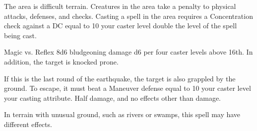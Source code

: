 \begin{spellheader}
\end{spellheader}
\begin{spellcontent}
    \begin{spelltargetinginfo}
    \end{spelltargetinginfo}
    \begin{spelleffects}
        \spelleffect The area is difficult terrain. Creatures in the area take a  penalty to physical attacks, defenses, and checks. Casting a spell in the area requires a Concentration check against a DC equal to 10 \add your caster level \add double the level of the spell being cast.
    \end{spelleffects}
\end{spellcontent}
\begin{spellsubcontent}
    \begin{spelltargetinginfo}
    \end{spelltargetinginfo}
    \begin{spelleffects}
        \begin{spellattack}{Magic vs. Reflex}
            \spellsuccess 8d6 bludgeoning damage \add d6 per four caster levels above 16th. In addition, the target is knocked prone.

            If this is the last round of the earthquake, the target is also grappled by the ground. To escape, it must beat a Maneuver defense equal to 10 \add your caster level \add your casting attribute.
            \spellfailure Half damage, and no effects other than damage.
        \end{spellattack}
    \end{spelleffects}
\end{spellsubcontent}
\begin{spellfooter}
    \spellnotes In terrain with unusual ground, such as rivers or swamps, this spell may have different effects.
\end{spellfooter}

